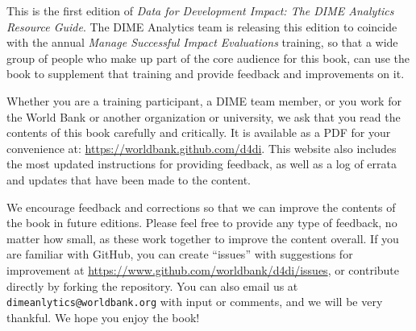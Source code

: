 This is the first edition of
\textit{Data for Development Impact:
The DIME Analytics Resource Guide}.
The DIME Analytics team is releasing this edition
to coincide with the annual \textit{Manage Successful Impact Evaluations} training,
so that a wide group of people who make up
part of the core audience for this book,
can use the book to supplement that training
and provide feedback and improvements on it.

Whether you are a training participant,
a DIME team member, or you work for the World Bank
or another organization or university,
we ask that you read the contents of this book carefully and critically.
It is available as a PDF for your convenience at:
\url{https://worldbank.github.com/d4di}.
This website also includes the most updated instructions
for providing feedback, as well as
a log of errata and updates that have been made to the content.

We encourage feedback and corrections
so that we can improve the contents of the book
in future editions.
Please feel free to provide any type of feedback,
no matter how small,
as these work together to improve the content overall.
If you are familiar with GitHub,
you can create ``issues'' with suggestions for improvement
at \url{https://www.github.com/worldbank/d4di/issues},
or contribute directly by forking the repository.
You can also email us at \texttt{dimeanlytics@worldbank.org}
with input or comments, and we will be very thankful.
We hope you enjoy the book!
